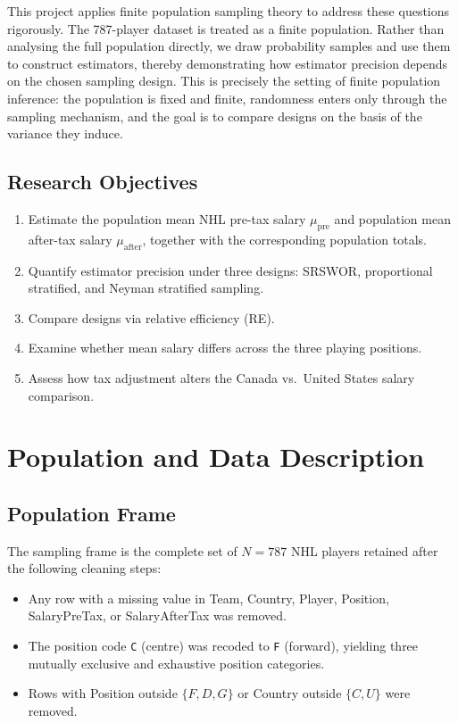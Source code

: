 \documentclass[12pt]{article}
\begin{document}
This project applies finite population sampling theory to address these questions
rigorously.
The 787-player dataset is treated as a finite population.
Rather than analysing the full population directly, we draw probability samples and
use them to construct estimators, thereby demonstrating how estimator precision depends
on the chosen sampling design.
This is precisely the setting of finite population inference: the population is fixed
and finite, randomness enters only through the sampling mechanism, and the goal is
to compare designs on the basis of the variance they induce.

\subsection*{Research Objectives}

\begin{enumerate}[nosep]
  \item Estimate the population mean NHL pre-tax salary $\mu_{\mathrm{pre}}$ and
        population mean after-tax salary $\mu_{\mathrm{after}}$, together with the
        corresponding population totals.
  \item Quantify estimator precision under three designs: SRSWOR, proportional
        stratified, and Neyman stratified sampling.
  \item Compare designs via relative efficiency (RE).
  \item Examine whether mean salary differs across the three playing positions.
  \item Assess how tax adjustment alters the Canada vs.\ United States salary
        comparison.
\end{enumerate}

\newpage

\section{Population and Data Description}
\label{sec:data}

\subsection{Population Frame}

The sampling frame is the complete set of $N = 787$ NHL players retained after the
following cleaning steps:
\begin{itemize}[nosep]
  \item Any row with a missing value in Team, Country, Player, Position, SalaryPreTax,
        or SalaryAfterTax was removed.
  \item The position code \texttt{C} (centre) was recoded to \texttt{F} (forward),
        yielding three mutually exclusive and exhaustive position categories.
  \item Rows with Position outside $\{F, D, G\}$ or Country outside $\{C, U\}$ were
        removed.
\end{itemize}
\end{document}
